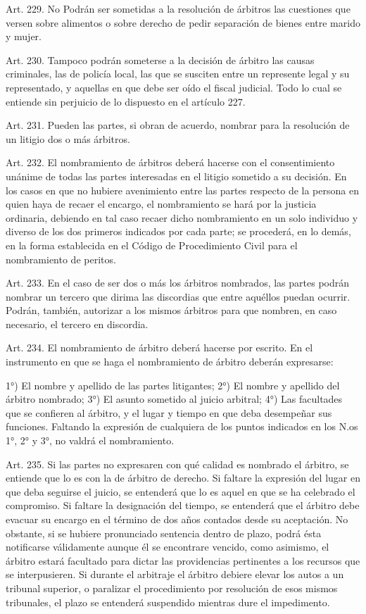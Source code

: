     Art. 229. No Podrán ser sometidas a la resolución de árbitros las cuestiones que versen sobre alimentos o sobre derecho de pedir separación de bienes entre marido y mujer.


    Art. 230. Tampoco podrán someterse a la decisión de árbitro las causas criminales, las de policía local, las que se susciten entre un represente legal y su representado, y aquellas en que debe ser oído el fiscal judicial.
    Todo lo cual se entiende sin perjuicio de lo dispuesto en el artículo 227.


    Art. 231. Pueden las partes, si obran de acuerdo, nombrar para la resolución de un litigio dos o más árbitros.

    Art. 232. El nombramiento de árbitros deberá hacerse con el consentimiento unánime de todas las partes interesadas en el litigio sometido a su decisión.
    En los casos en que no hubiere avenimiento entre las partes respecto de la persona en quien haya de recaer el encargo, el nombramiento se hará por la justicia ordinaria, debiendo en tal caso recaer dicho nombramiento en un solo individuo y diverso de los dos primeros indicados por cada parte; se procederá, en lo demás, en la forma establecida en el Código de Procedimiento Civil para el nombramiento de peritos.


    Art. 233. En el caso de ser dos o más los árbitros nombrados, las partes podrán nombrar un tercero que dirima las discordias que entre aquéllos puedan ocurrir.
    Podrán, también, autorizar a los mismos árbitros para que nombren, en caso necesario, el tercero en discordia.

    Art. 234. El nombramiento de árbitro deberá hacerse por escrito. En el instrumento en que se haga el nombramiento de árbitro deberán expresarse:

    1°) El nombre y apellido de las partes litigantes;
    2°) El nombre y apellido del árbitro nombrado;
    3°) El asunto sometido al juicio arbitral;
    4°) Las facultades que se confieren al árbitro, y el lugar y tiempo en que deba desempeñar sus funciones.
    Faltando la expresión de cualquiera de los puntos indicados en los N.os 1°, 2° y 3°, no valdrá el nombramiento.

    Art. 235. Si las partes no expresaren con qué calidad es nombrado el árbitro, se entiende que lo es con la de árbitro de derecho.
    Si faltare la expresión del lugar en que deba seguirse el juicio, se entenderá que lo es aquel en que se ha celebrado el compromiso.
    Si faltare la designación del tiempo, se entenderá que el árbitro debe evacuar su encargo en el término de dos años contados desde su aceptación.
    No obstante, si se hubiere pronunciado sentencia dentro de plazo, podrá ésta notificarse válidamente aunque él se encontrare vencido, como asimismo, el árbitro estará facultado para dictar las providencias pertinentes a los recursos que se interpusieren.
    Si durante el arbitraje el árbitro debiere elevar los autos a un tribunal superior, o paralizar el procedimiento por resolución de esos mismos tribunales, el plazo se entenderá suspendido mientras dure el impedimento.


